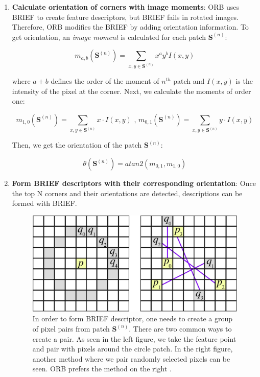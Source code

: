 \documentclass[a4paper]{report}
\numberwithin{figure}{section}
\begin{document}
\begin{appendices}
\begin{enumerate}
	\item \textbf{Calculate orientation of corners with image moments}: ORB 
	uses BRIEF to create feature descriptors, but BRIEF fails in rotated 
	images. Therefore, ORB modifies the BRIEF by adding orientation 
	information. To get orientation, an \textit{image moment} is calculated 
	for each patch $\mathbf{S}^{(n)}$:
	
	\begin{equation}
	m_{a,b}(\mathbf{S}^{(n)}) = \sum_{x,y \in \mathbf{S}^{(n)}} x^a y^b I(x,y)
	\end{equation}
	
	where $a + b$ defines the order of the moment of $n^{th}$ patch and 
	$I(x,y)$ is the intensity of the pixel at the corner. Next, we calculate 
	the moments of order one: 
	
	\begin{equation}
	m_{1,0}(\mathbf{S}^{(n)}) = \sum_{x,y \in \mathbf{S}^{(n)}} x \cdot I(x,y) 
	\text{  ,  }
	m_{0,1}(\mathbf{S}^{(n)}) = \sum_{x,y \in \mathbf{S}^{(n)}} y \cdot I(x,y)
	\end{equation}
	
	Then, we get the orientation of the patch $\mathbf{S}^{(n)}$:
	
	\begin{equation}
	\theta(\mathbf{S}^{(n)}) = atan2(m_{0,1}, m_{1,0})
	\end{equation}
	
	\item \textbf{Form BRIEF descriptors with their corresponding 
		orientation}: Once the top N corners and their orientations are 
		detected, 
	descriptions can be formed with BRIEF. 
	
	\begin{figure}[H]
		\centering
		\includegraphics[width=0.6\linewidth,natwidth=640,natheight=640]
		{fig/ref_imgs/brief.png}
		\caption[BRIEF Descriptor]{In order to form BRIEF descriptor, one 
		needs 
			to create a group of pixel pairs from patch $\mathbf{S}^{(n)}$. 
			There are 
			two common ways to create a pair. As seen in the left figure, we 
			take the 
			feature point and pair with pixels around the circle patch. In the 
			right 
			figure, another method where we pair randomly selected pixels can 
			be 
			seen. ORB prefers the method on the right \parencite{Klette2014}.}
		\label{fig:brief}
	\end{figure}
	

\end{enumerate}
\end{appendices}
\end{document}
